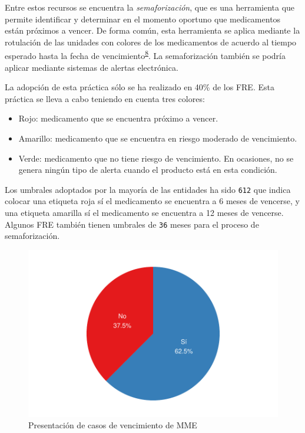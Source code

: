 \documentclass[
]{book}
\providecommand{\tightlist}{%
  \setlength{\itemsep}{0pt}\setlength{\parskip}{0pt}}
\begin{document}
Entre estos recursos se encuentra la \emph{semaforización}, que es una herramienta que permite identificar y determinar en el momento oportuno que medicamentos están próximos a vencer. De forma común, esta herramienta se aplica mediante la rotulación de las unidades con colores de los medicamentos de acuerdo al tiempo esperado hasta la fecha de vencimiento\textsuperscript{\protect\hyperlink{ref-HernandezVera2017}{8}}. La semaforización también se podría aplicar mediante sistemas de alertas electrónica.

La adopción de esta práctica sólo se ha realizado en 40\% de los FRE. Esta práctica se lleva a cabo teniendo en cuenta tres colores:

\begin{itemize}
\tightlist
\item
  Rojo: medicamento que se encuentra próximo a vencer.
\item
  Amarillo: medicamento que se encuentra en riesgo moderado de vencimiento.
\item
  Verde: medicamento que no tiene riesgo de vencimiento. En ocasiones, no se genera ningún tipo de alerta cuando el producto está en esta condición.
\end{itemize}

Los umbrales adoptados por la mayoría de las entidades ha sido \texttt{6\textbar{}12} que indica colocar una etiqueta roja sí el medicamento se encuentra a 6 meses de vencerse, y una etiqueta amarilla sí el medicamento se encuentra a 12 meses de vencerse. Algunos FRE también tienen umbrales de \texttt{3\textbar{}6} meses para el proceso de semaforización.

\begin{figure}
\includegraphics[width=0.85\linewidth]{InformeFinal_files/figure-latex/CasosVencimiento1-1} \caption{Presentación de casos de vencimiento de MME}\label{fig:CasosVencimiento1}
\end{figure}
\end{document}
